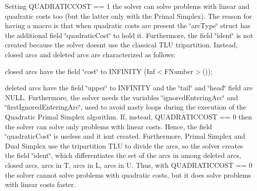 Setting Q\+U\+A\+D\+R\+A\+T\+I\+C\+C\+O\+ST == 1 the solver can solve problems with linear and quadratic costs too (but the latter only with the Primal Simplex). The reason for having a macro is that when quadratic costs are present the \char`\"{}arc\+Type\char`\"{} struct has the additional field \char`\"{}quadratic\+Cost\char`\"{} to hold it. Furthermore, the field \char`\"{}ident\char`\"{} is not created because the solver doesn\textquotesingle{}t use the classical T\+LU tripartition. Instead, closed arcs and deleted arcs are characterized as follows\+:
\begin{DoxyItemize}
\item closed arcs have the field \char`\"{}cost\char`\"{} to I\+N\+F\+I\+N\+I\+TY (Inf$<$\+F\+Number$>$());
\item deleted arcs have the field \char`\"{}upper\char`\"{} to I\+N\+F\+I\+N\+I\+TY and the \char`\"{}tail\char`\"{} and \char`\"{}head\char`\"{} field are N\+U\+LL. Furthermore, the solver needs the variables \char`\"{}ignored\+Entering\+Arc\char`\"{} and \char`\"{}first\+Ignored\+Entering\+Arc\char`\"{}, used to avoid nasty loops during the execution of the Quadratic Primal Simplex algorithm. If, instead, Q\+U\+A\+D\+R\+A\+T\+I\+C\+C\+O\+ST == 0 then the solver can solve only problems with linear costs. Hence, the field \char`\"{}quadratic\+Cost\char`\"{} is useless and it isn\textquotesingle{}t created. Furthermore, Primal Simplex and Dual Simplex use the tripartition T\+LU to divide the arcs, so the solver creates the field \char`\"{}ident\char`\"{}, which differentiates the set of the arcs in among deleted arcs, closed arcs, arcs in T, arcs in L, arcs in U. Thus, with Q\+U\+A\+D\+R\+A\+T\+I\+C\+C\+O\+ST == 0 the solver cannot solve problems with quadratic costs, but it does solve problems with linear costs faster. 
\end{DoxyItemize}
